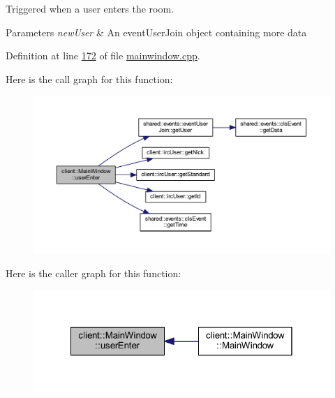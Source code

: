 Triggered when a user enters the room. 


\begin{DoxyParams}{Parameters}
{\em new\-User} & An event\-User\-Join object containing more data \\
\hline
\end{DoxyParams}


Definition at line \hyperlink{mainwindow_8cpp_source_l00172}{172} of file \hyperlink{mainwindow_8cpp_source}{mainwindow.\-cpp}.



Here is the call graph for this function\-:\nopagebreak
\begin{figure}[H]
\begin{center}
\leavevmode
\includegraphics[width=350pt]{d2/da4/classclient_1_1_main_window_a62f7f15ddd56fd52acd7ba01fa6354b4_cgraph}
\end{center}
\end{figure}




Here is the caller graph for this function\-:
\nopagebreak
\begin{figure}[H]
\begin{center}
\leavevmode
\includegraphics[width=320pt]{d2/da4/classclient_1_1_main_window_a62f7f15ddd56fd52acd7ba01fa6354b4_icgraph}
\end{center}
\end{figure}


